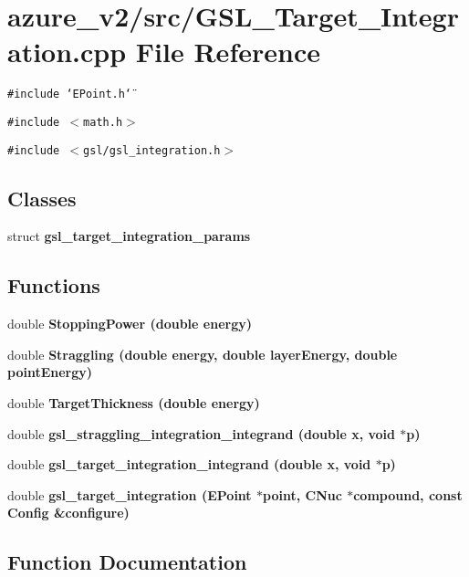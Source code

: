 \section{azure\_\-v2/src/GSL\_\-Target\_\-Integration.cpp File Reference}
\label{GSL__Target__Integration_8cpp}
{\tt \#include \char`\"{}EPoint.h\char`\"{}}\par
{\tt \#include $<$math.h$>$}\par
{\tt \#include $<$gsl/gsl\_\-integration.h$>$}\par
\subsection*{Classes}
\begin{CompactItemize}
\item 
struct \bf{gsl\_\-target\_\-integration\_\-params}
\end{CompactItemize}
\subsection*{Functions}
\begin{CompactItemize}
\item 
double \bf{Stopping\-Power} (double energy)
\item 
double \bf{Straggling} (double energy, double layer\-Energy, double point\-Energy)
\item 
double \bf{Target\-Thickness} (double energy)
\item 
double \bf{gsl\_\-straggling\_\-integration\_\-integrand} (double x, void $\ast$p)
\item 
double \bf{gsl\_\-target\_\-integration\_\-integrand} (double x, void $\ast$p)
\item 
double \bf{gsl\_\-target\_\-integration} (\bf{EPoint} $\ast$point, \bf{CNuc} $\ast$compound, const \bf{Config} \&configure)
\end{CompactItemize}


\subsection{Function Documentation}
